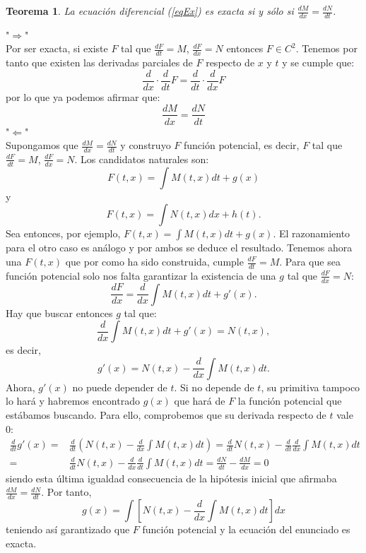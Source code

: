 \documentclass[11pt]{article}
\makeatletter
\theoremstyle{theorem-style}  %
\newtheorem{theorem}{Teorema}[section]  %
\renewenvironment{proof}[1][\proofname]{\par
	\pushQED{\qed}%
	\normalfont \topsep6\p@\@plus6\p@\relax
	\list{}{%
		\settowidth{\leftmargin}{\quad:\hskip\labelsep}%
		\setlength{\labelwidth}{0pt}%
		\setlength{\itemindent}{-\leftmargin}%
	}%
	\item[\hskip\labelsep\itshape#1\@addpunct{:}]\ignorespaces
}{%
	\popQED\endlist\@endpefalse
}
\theoremstyle{definition-style}
\theoremstyle{example-style}
\makeatother
\begin{document}
\begin{theorem}
	La ecuación diferencial (\ref{eqEx}) es exacta si y sólo si $\frac{dM}{dx} = \frac{dN}{dt}$.
\end{theorem}
\begin{proof}
	"$\Rightarrow$" \\
	Por ser exacta, si existe $F$ tal que $\frac{dF}{dt} = M$, $\frac{dF}{dx} = N$ entonces $F \in C^2$. Tenemos por tanto que existen las derivadas parciales de $F$ respecto de $x$ y $t$ y se cumple que:
	\[ \frac{d}{dx} \cdot \frac{d}{dt} F = \frac{d}{dt} \cdot \frac{d}{dx} F\]
	por lo que ya podemos afirmar que:
	\[\frac{dM}{dx} = \frac{dN}{dt}\]
	"$\Leftarrow$" \\
	Supongamos que $\frac{dM}{dx} = \frac{dN}{dt}$  y construyo $F$ función potencial, es decir, $F$ tal que $\frac{dF}{dt} = M$, $\frac{dF}{dx} = N$. Los candidatos naturales son:
	\[F(t,x)=\int M(t, x)dt + g(x)\]
	y
	\[F(t,x)=\int N(t, x)dx + h(t).\]
	Sea entonces, por ejemplo, $F(t, x) = \int M(t, x)dt + g(x)$. El razonamiento para el otro caso es análogo y por ambos se deduce el resultado. Tenemos ahora una $ F(t,x) $ que por como ha sido construida, cumple $\frac{dF}{dt} = M$. Para que sea función potencial solo nos falta garantizar la existencia de una $g$ tal que $\frac{dF}{dx} = N$:
	\[\frac{dF}{dx} = \frac{d}{dx}\int M(t, x)dt + g'(x).\]
	Hay que buscar entonces $g$ tal que:
	\[\frac{d}{dx}\int M(t, x)dt + g'(x) = N(t, x),\]
	es decir, 
	\[g'(x) = N(t, x) - \frac{d}{dx}\int M(t, x)dt.\]
	Ahora, $ g'(x) $ no puede depender de $ t $. Si no depende de $ t $, su primitiva tampoco lo hará y habremos encontrado $g(x)  $ que hará de $ F $ la función potencial que estábamos buscando. Para ello, comprobemos que su derivada respecto de $ t $ vale 0:
	\begin{align*}
	\frac{d}{dt} g'(x)=	& \frac{d}{dt}\left( N(t, x) - \frac{d}{dx}\int M(t, x)dt\right)  =  \frac{d}{dt}N(t, x) -  \frac{d}{dt}\frac{d}{dx}\int M(t, x)dt  \\
		=& \frac{d}{dt}N(t, x) -  \frac{d}{dx}\frac{d}{dt}\int M(t, x)dt = 
		\frac{dN}{dt} - \frac{dM}{dx} = 0
	\end{align*}
	siendo esta última igualdad consecuencia de la hipótesis inicial que afirmaba $\frac{dM}{dx} = \frac{dN}{dt}$. Por tanto, 
	\[g(x) = \int\left[ N(t, x) - \frac{d}{dx}\int M(t, x)dt\right] dx\]
	teniendo así garantizado que $F$ función potencial y la ecuación del enunciado es exacta.
\end{proof}
\end{document}
